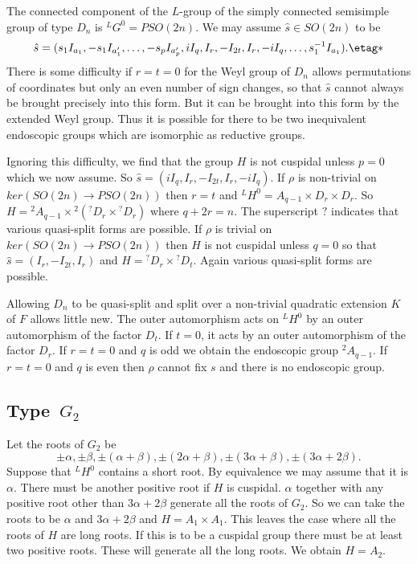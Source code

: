 \documentclass{memo-l}
\theoremstyle{definition}
\theoremstyle{remark}
\numberwithin{section}{chapter}
\numberwithin{equation}{chapter}
\begin{document}
   The connected component of the $L$-group of the simply connected
semisimple group of type $D_{n}$ is ${}^{L}G^{0} = PSO(2n)$.  We may assume
$\hat s  \in  SO(2n)$ to be
$$
\hat s  = (s_{1}I_{a_{1}},-s_{1}I_{a_{1}'},\ldots,-s_{p}I_{a_{p}'},
iI_{q},I_{r},-I_{2t},I_{r},-iI_{q},\ldots ,s_{1}^{-1}I_{a_1}).	 \etag *
$$
There is some difficulty if $r = t = 0$ for the Weyl group of $D_{n}$ allows
permutations of coordinates but only an even number of sign changes, so
that $\hat s $ cannot always be brought precisely into this form.  But it
can be brought into this form by the extended Weyl group.  Thus it is
possible for there to be two inequivalent endoscopic groups which are
isomorphic as reductive groups.

   Ignoring this difficulty, we find that the group $H$ is not cuspidal
unless $p = 0$ which we now assume.  So $\hat s
 = (iI_{q},I_{r},-I_{2t},I_{r},-iI_{q})$.  If ${\rho }$ is non-trivial on
$ker(SO(2n) {\to} PSO(2n))$ then $r = t$ and ${}^{L}H^{0}  =  A_{q-1} \times
D_{r} \times D_{r}$.  So $H  =  {}^{2}A_{q-1} \times {}^{2}({}^{?}D_{r} \times
{}^{?}D_{r})$ where $q+2r = n$.  The superscript $?$ indicates that various
quasi-split forms are possible.  If ${\rho }$ is trivial on $ker(SO(2n)
{\to} PSO(2n))$ then $H$ is not cuspidal unless $q = 0$ so that $\hat s  =
(I_{r},-I_{2t},I_{r})$ and $H  =  {}^{?}D_{r} \times {}^{?}D_{t}$.  Again
various quasi-split forms are possible.

   Allowing $D_{n}$ to be quasi-split and split over a non-trivial
quadratic extension $K$ of $F$ allows little new.  The outer automorphism
acts on ${}^{L}H^{0}$ by an outer automorphism of the factor $D_{t}$.  If
$t = 0$, it acts by an outer automorphism of the factor $D_{r}$.  If $r = t = 0$
and $q$ is odd we obtain the endoscopic group ${}^{2}A_{q-1}$.  If $r = t = 0$
and $q$ is even then ${\rho }$ cannot fix  $s$ and there is no endoscopic
group.

\subsection{Type\ $G_2$}

   Let the roots of $G_{2}$ be $${\pm}{\alpha}, {\pm}{\beta},
{\pm}({\alpha}+{\beta}), {\pm}(2{\alpha}+{\beta}),
{\pm}(3{\alpha}+{\beta}), {\pm}(3{\alpha}+2{\beta}).$$  Suppose that
${}^{L}H^{0}$ contains a short root.  By equivalence we may assume that it is
${\alpha}$.  There must be another positive root if $H$ is cuspidal.
${\alpha}$ together with any positive root other than $3{\alpha}+2{\beta}$
generate all the roots of $G_{2}$.  So we can take the roots to be
${\alpha}$ and $3{\alpha}+2{\beta}$ and $H  =  A_{1} \times A_{1}$.  This
leaves the case where all the roots of $H$ are long roots.  If this is to
be a cuspidal group there must be at least two positive roots.  These will
generate all the long roots.  We obtain $H  =  A_{2}$.
\end{document}
